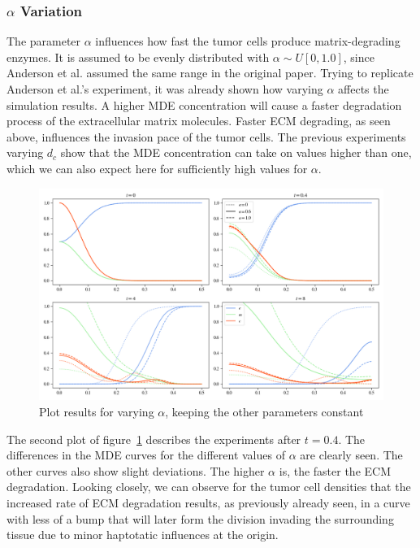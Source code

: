 \subsubsection*{$\alpha$ Variation}
The parameter $\alpha$ influences how fast the tumor cells produce matrix-degrading enzymes. It is assumed to be evenly distributed with $\alpha \sim U[0, 1.0]$, since Anderson et al. assumed the same range in the original paper. Trying to replicate Anderson et al.'s experiment, it was already shown how varying $\alpha$ affects the simulation results. A higher MDE concentration will cause a faster degradation process of the extracellular matrix molecules. Faster ECM degrading, as seen above, influences the invasion pace of the tumor cells. The previous experiments varying $d_c$ show that the MDE concentration can take on values higher than one, which we can also expect here for sufficiently high values for $\alpha$. 
\begin{figure}[h]
 \centering
 \includegraphics[width=\textwidth]{resources/images/alpha_variation.png}
 \caption{Plot results for varying $\alpha$, keeping the other parameters constant}
 \label{fig:alpha_variation}
\end{figure}

The second plot of figure~\ref{fig:alpha_variation} describes the experiments after $t=0.4$. The differences in the MDE curves for the different values of $\alpha$ are clearly seen. The other curves also show slight deviations. The higher $\alpha$ is, the faster the ECM degradation. Looking closely, we can observe for the tumor cell densities that the increased rate of ECM degradation results, as previously already seen, in a curve with less of a bump that will later form the division invading the surrounding tissue due to minor haptotatic influences at the origin.

